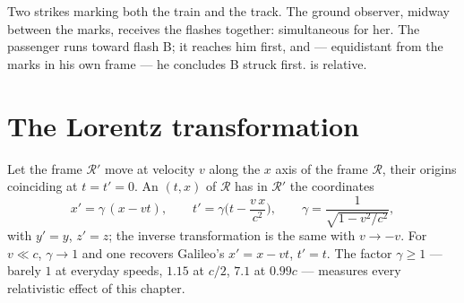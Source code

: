 \begin{omfigure}

{\small Two strikes marking both the train and the track. The ground
observer, midway between the marks, receives the flashes together:
simultaneous for her. The passenger runs toward flash B; it reaches
him first, and --- equidistant from the marks in his own frame --- he
concludes B struck first.  is relative.}
\end{omfigure}

\section{The Lorentz transformation}

\begin{theorem}\label{thm:b3:relativistic-kinematics:lorentz}
Let the frame $\mathcal R'$ move at velocity $v$ along the $x$ axis of
the frame $\mathcal R$, their origins coinciding at $t = t' = 0$. An
 $(t, x)$ of $\mathcal R$ has in $\mathcal R'$ the coordinates
\[
x' = \gamma\,(x - vt) , \qquad
t' = \gamma\Big(t - \frac{v\,x}{c^2}\Big) , \qquad
\gamma = \frac{1}{\sqrt{1 - v^2/c^2}} ,
\]
with $y' = y$, $z' = z$; the inverse transformation is the same with
$v \to -v$. For $v \ll c$, $\gamma \to 1$ and one recovers Galileo's
$x' = x - vt$, $t' = t$. The factor $\gamma \ge 1$ --- barely $1$ at
everyday speeds, $1.15$ at $c/2$, $7.1$ at $0.99c$ --- measures every
relativistic effect of this chapter.
\end{theorem}

